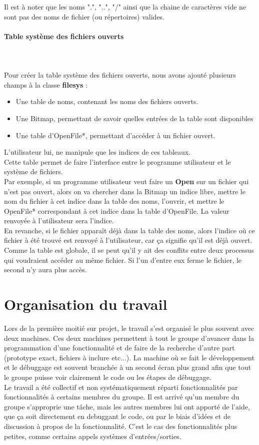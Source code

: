 \documentclass{report}
\newcommand{\myparagraph}[1]{\paragraph*{#1}\mbox{}\\}
\begin{document}
Il est à noter que les noms ".", "..", "/" ainsi que la chaine de caractères vide ne sont pas des noms de fichier (ou répertoires) valides.
\myparagraph{Table système des fichiers ouverts}\\	
Pour créer la table système des fichiers ouverts, nous avons ajouté plusieurs champs à la classe \textbf{filesys} :
\begin{itemize}
\item Une table de noms, contenant les noms des fichiers ouverts.
\item Une Bitmap, permettant de savoir quelles entrées de la table sont disponibles

\item Une table d'OpenFile*, permettant d’accéder à un fichier ouvert.
\end{itemize}
L'utilisateur lui, ne manipule que les indices de ces tableaux.\\
Cette table permet de faire l'interface entre le programme utilisateur et le système de fichiers.\\

Par exemple, si un programme utilisateur veut faire un \textbf{Open} sur un fichier qui n'est pas ouvert, alors on va chercher dans la Bitmap un indice libre, mettre le nom du fichier à cet indice dans la table des noms, l'ouvrir, et mettre le OpenFile* correspondant à cet indice dans la table d'OpenFile.
La valeur renvoyée à l'utilisateur sera l'indice.\\

En revanche, si le fichier apparaît déjà dans la table des noms, alors l'indice où ce fichier à été trouvé est renvoyé à l'utilisateur, car ça signifie qu'il est déjà ouvert.\\

Comme la table est globale, il se peut qu'il y ait des conflits entre deux processus qui voudraient accéder au même fichier. Si l'un d'entre eux ferme le fichier, le second n'y aura plus accès.\\
\section*{Organisation du travail}
Lors de la première moitié sur projet, le travail s'est organisé le plus souvent avec deux machines. Ces deux machines permettent à tout le groupe d'avancer dans la programmation d'une fonctionnalité et de faire de la recherche d'autre part (prototype exact, fichiers à inclure etc...). La machine où se fait le développement et le débuggage est souvent branchée à un second écran plus grand afin que tout le groupe puisse voir clairement le code ou les étapes de débuggage.\\
Le travail a été collectif et non systématiquement réparti fonctionnalités par fonctionnalités à certains membres du groupe. Il est arrivé qu'un membre du groupe s'approprie une tâche, mais les autres membres lui ont apporté de l'aide, que ça soit directement en debuggant le code, ou par le biais d'idées et de discussion à propos de la fonctionnalité. C'est le cas des fonctionnalités plus petites, comme certains appels systèmes d'entrées/sorties.\\
\end{document}

